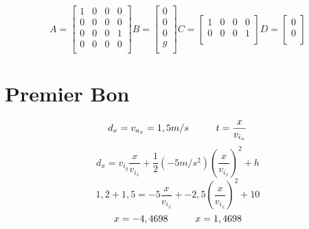 \documentclass{article}
\begin{document}
\begin{equation}
	A = 
  	\begin{bmatrix}
  	1 & 0 & 0 & 0 \\ 
  	0 & 0 & 0 & 0 \\
  	0 & 0 & 0 & 1 \\ 
  	0 & 0 & 0 & 0 \\
  	\end{bmatrix}
  	B = 
  	\begin{bmatrix}
  	0 \\ 
  	0 \\ 
  	0 \\ 
  	g \\
  	\end{bmatrix}
  	C =
  	\begin{bmatrix}
  	1 & 0 & 0 & 0 \\ 
  	0 & 0 & 0 & 1 \\
  	\end{bmatrix}
  	D = 
  	\begin{bmatrix}
  	0 \\ 
  	0 \\
  	\end{bmatrix}
\end{equation}
\section{Premier Bon}
\begin{equation}
	d_{x} = v_{a_{x}} = 1,5 m/s \hspace{10mm} t=\frac{x}{v_{i_{x}}}
\end{equation}
\begin{equation}
	d_{x} = {v_{i_{y}}} \frac{x}{v_{i_{x}}} + \frac{1}{2}(-5 m/s^2)(\frac{x}{v_{i_{x}}})^2 + h
\end{equation}
\begin{equation}
	1,2+1,5 = -5 \frac{x}{v_{i_{x}}} + -2,5(\frac{x}{v_{i_{x}}})^2 + 10
\end{equation}
\begin{equation}
	x = -4,4698 \hspace{10mm}
	x = 1,4698
\end{equation}
\end{document}
